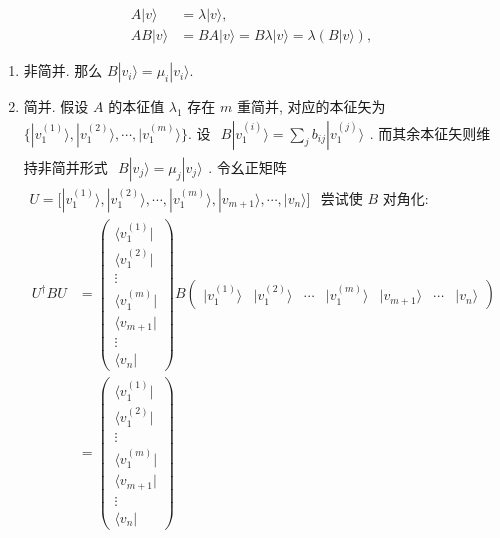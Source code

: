 \documentclass[../../main.tex]{subfiles}
\begin{document}
\begin{enumerate}
{{\begin{enumerate}
    \begin{align*}
      A|v\rangle &= \lambda|v\rangle,\\
      AB|v\rangle &= BA|v\rangle = B\lambda|v\rangle = \lambda \left(B|v\rangle\right),
    \end{align*}
    \begin{enumerate}
      \item 非简并. 那么 $B|v_{i}\rangle = \mu_{i}|v_{i}\rangle$. 
      \item 简并. 假设 $A$ 的本征值 $\lambda_{1}$ 存在 $m$ 重简并, 对应的本征矢为 $\{|v_{1}^{(1)}\rangle, |v_{1}^{(2)}\rangle,\cdots, |v_{1}^{(m)}\rangle\}$. 设 $\begin{aligned}
        B|v_{1}^{(i)}\rangle = \sum_{j}b_{ij}|v_{1}^{(j)}\rangle
      \end{aligned}$. 而其余本征矢则维持非简并形式 $\begin{aligned}
        B|v_{j}\rangle = \mu_{j}|v_{j}\rangle
      \end{aligned}$. 令幺正矩阵 $\begin{aligned}
        U = \bigg[|v_{1}^{(1)}\rangle, |v_{1}^{(2)}\rangle,\cdots, |v_{1}^{(m)}\rangle,|v_{m+1}\rangle,\cdots,|v_{n}\rangle\bigg]
      \end{aligned}$ 尝试使 $B$ 对角化:
      \begin{align*}
        U^{\dagger}BU &= \begin{pmatrix}
          \langle v_{1}^{(1)}| \\ \langle v_{1}^{(2)}| \\ \vdots \\ \langle v_{1}^{(m)}| \\ \langle v_{m+1}| \\ \vdots \\ \langle v_{n}|
        \end{pmatrix}B\begin{pmatrix}
          |v_{1}^{(1)}\rangle & |v_{1}^{(2)}\rangle & \cdots & |v_{1}^{(m)}\rangle & |v_{m+1}\rangle & \cdots & |v_{n}\rangle
        \end{pmatrix}\\
        &= \begin{pmatrix}
          \langle v_{1}^{(1)}| \\ \langle v_{1}^{(2)}| \\ \vdots \\ \langle v_{1}^{(m)}| \\ \langle v_{m+1}| \\ \vdots \\ \langle v_{n}|

\end{pmatrix}
\end{align*}
\end{enumerate}
\end{enumerate}}}
\end{enumerate}
\end{document}
